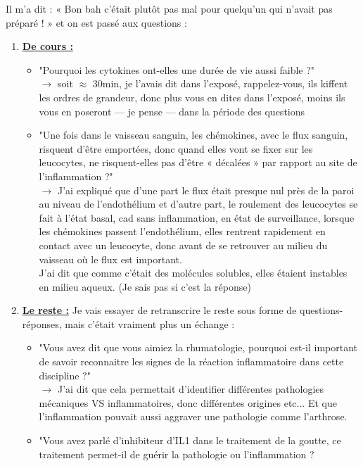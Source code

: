 Il m’a dit : « Bon bah c’était plutôt pas mal pour quelqu’un qui n’avait pas préparé ! » et on est passé aux questions :\\

\begin{enumerate}[label=\blacksquare]
    \item \uline{\textbf{De cours :}} 
    \begin{itemize}
        \item "Pourquoi les cytokines ont-elles une durée de vie aussi faible ?" \\
        $\longrightarrow$ soit $\approx$ 30min, je l’avais dit dans l’exposé, rappelez-vous, ils kiffent les ordres de grandeur, donc plus vous en dites dans l’exposé, moins ils vous en poseront — je pense — dans la période des questions
        \item "Une fois dans le vaisseau sanguin, les chémokines, avec le flux sanguin, risquent d’être emportées, donc quand elles vont se fixer sur les leucocytes, ne risquent-elles pas d’être « décalées » par rapport au site de l’inflammation ?"\\
        $\longrightarrow$ J’ai expliqué que d’une part le flux était presque nul près de la paroi au niveau de l’endothélium et d’autre part, le roulement des leucocytes se fait à l’état basal, cad sans inflammation, en état de surveillance, lorsque les chémokines passent l’endothélium, elles rentrent rapidement en contact avec un leucocyte, donc avant de se retrouver au milieu du vaisseau où le flux est important.\\
        J’ai dit que comme c’était des molécules solubles, elles étaient instables en milieu aqueux. (Je sais pas si c’est la réponse)
    \end{itemize}
    \item \uline{\textbf{Le reste :}}  Je vais essayer de retranscrire le reste sous forme de questions-réponses, mais c’était vraiment plus un échange :
    \begin{itemize}
        \item "Vous avez dit que vous aimiez la rhumatologie, pourquoi est-il important de savoir reconnaitre les signes de la réaction inflammatoire dans cette discipline ?"\\
        $\longrightarrow$ J’ai dit que cela permettait d’identifier différentes pathologies mécaniques VS inflammatoires, donc différentes origines etc... Et que l’inflammation pouvait aussi aggraver une pathologie comme l'arthrose.\\
        \item "Vous avez parlé d’inhibiteur d’IL1 dans le traitement de la goutte, ce traitement permet-il de guérir la pathologie ou l’inflammation ?\\

\end{itemize}
\end{enumerate}
